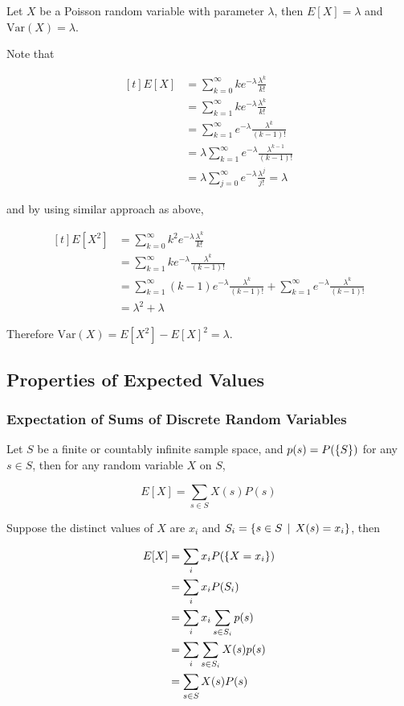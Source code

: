 \documentclass[a4paper,12pt]{article}
\begin{document}
\begin{pst}
  Let $X$ be a Poisson random variable with parameter $\lambda$, then $E[X]=\lambda$ and $\mathrm{Var}(X)=\lambda$.\n

  \prf Note that

  $$\begin{aligned}[t]
    E[X]&=\sum_{k=0}^{\infty}ke^{-\lambda}\frac{\lambda^{k}}{k!}\\
    &=\sum_{k=1}^{\infty}ke^{-\lambda}\frac{\lambda^{k}}{k!}\\
    &=\sum_{k=1}^{\infty}e^{-\lambda}\frac{\lambda^{k}}{(k-1)!}\\
    &=\lambda\sum_{k=1}^{\infty}e^{-\lambda}\frac{\lambda^{k-1}}{(k-1)!}\\
    &=\lambda\sum_{j=0}^{\infty}e^{-\lambda}\frac{\lambda^{j}}{j!}=\lambda
  \end{aligned}$$\s

  and by using similar approach as above,

  $$\begin{aligned}[t]
    E[X^{2}]&=\sum_{k=0}^{\infty}k^{2}e^{-\lambda}\frac{\lambda^{k}}{k!}\\
    &=\sum_{k=1}^{\infty}ke^{-\lambda}\frac{\lambda^{k}}{(k-1)!}\\
    &=\sum_{k=1}^{\infty}(k-1)e^{-\lambda}\frac{\lambda^{k}}{(k-1)!}+\sum_{k=1}^{\infty}e^{-\lambda}\frac{\lambda^{k}}{(k-1)!}\\
    &=\lambda^{2}+\lambda
  \end{aligned}$$\s

  Therefore $\mathrm{Var}(X)=E[X^{2}]-E[X]^{2}=\lambda$.
\end{pst}

\subsection{Properties of Expected Values}
\subsubsection{Expectation of Sums of Discrete Random Variables}
\begin{pst}
  Let $S$ be a finite or countably infinite sample space, and $p(s)=P(\left\{ S\right\})$ for any $s\in S$, then for any random variable $X$ on $S$,

  $$E[X]=\sum_{s\in S}X(s)P(s)$$\s

  \prf Suppose the distinct values of $X$ are $x_{i}$ and $S_{i}=\left\{ s\in S\,\mid\, X(s)=x_{i}\right\}$, then

  $$\begin{aligned}[t]
    E[X]&=\sum_{i}x_{i}P(\left\{ X=x_{i}\right\})\\
    &=\sum_{i}x_{i}P(S_{i})\\
    &=\sum_{i}x_{i}\sum_{s\in S_{i}}p(s)\\
    &=\sum_{i}\sum_{s\in S_{i}}X(s)p(s)\\
    &=\sum_{s\in S}X(s)P(s)
  \end{aligned}$$
\end{pst}\n
\end{document}
